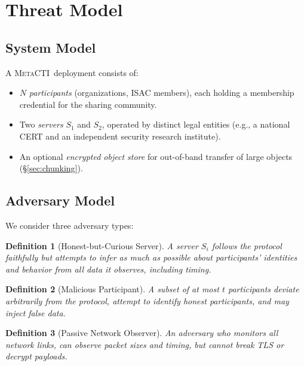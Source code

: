 \documentclass[letterpaper,twocolumn,10pt]{article}
\newtheorem{definition}{Definition}
\newcommand{\metacti}{\textsc{MetaCTI}}
\begin{document}
\section{Threat Model}
\label{sec:threat_model}

\subsection{System Model}

A \metacti\ deployment consists of:
\begin{itemize}[nosep]
  \item $N$ \emph{participants} (organizations, ISAC members), each
        holding a membership credential for the sharing community.
  \item Two \emph{servers} $S_1$ and $S_2$, operated by distinct legal
        entities (e.g., a national CERT and an independent security
        research institute).
  \item An optional \emph{encrypted object store} for out-of-band
        transfer of large objects (§\ref{sec:chunking}).
\end{itemize}

\subsection{Adversary Model}

We consider three adversary types:

\begin{definition}[Honest-but-Curious Server]
  A server $S_i$ follows the protocol faithfully but attempts to infer
  as much as possible about participants' identities and behavior from
  all data it observes, including timing.
\end{definition}

\begin{definition}[Malicious Participant]
  A subset of at most $t$ participants deviate arbitrarily from the
  protocol, attempt to identify honest participants, and may inject
  false data.
\end{definition}

\begin{definition}[Passive Network Observer]
  An adversary who monitors all network links, can observe packet
  sizes and timing, but cannot break TLS or decrypt payloads.
\end{definition}
\end{document}
